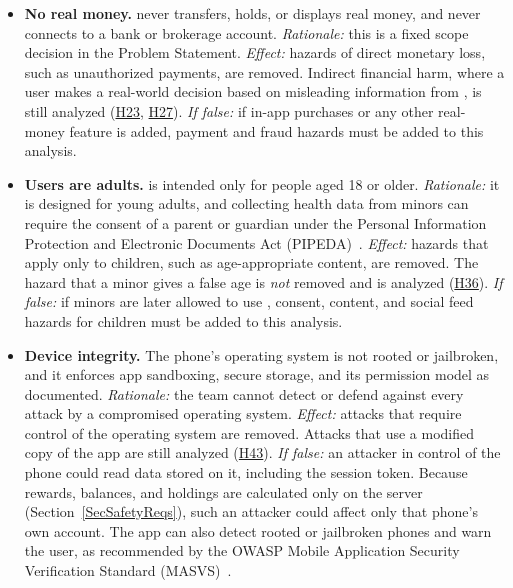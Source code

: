 \documentclass{article}
\begin{document}
\begin{itemize}
  \item[CA1:] \textbf{No real money.} \progname{} never transfers, holds, or
        displays real money, and never connects to a bank or brokerage account.
        \emph{Rationale:} this is a fixed scope decision in the Problem Statement.
        \emph{Effect:} hazards of direct monetary loss, such as unauthorized payments,
        are removed. Indirect financial harm, where a user makes a real-world decision
        based on misleading information from \progname{}, is still analyzed (\hyperref[H23]{H23}, \hyperref[H27]{H27}). \emph{If false:} if in-app purchases or any other
        real-money feature is added, payment and fraud hazards must be added to this
        analysis.
  \item[CA2:] \textbf{Users are adults.} \progname{} is intended only for
        people aged 18 or older. \emph{Rationale:} it is designed for young adults,
        and collecting health data from minors can require the consent of a parent or
        guardian under the Personal Information Protection and Electronic Documents
        Act (PIPEDA)~\cite{PIPEDA}. \emph{Effect:} hazards that apply only to
        children, such as age-appropriate content, are removed. The hazard that a
        minor gives a false age is \emph{not} removed and is analyzed (\hyperref[H36]{H36}). \emph{If false:} if minors are later allowed to use
        \progname{}, consent, content, and social feed hazards for children must be
        added to this analysis.
  \item[CA3:] \textbf{Device integrity.} The phone's operating system is not
        rooted or jailbroken, and it enforces app sandboxing, secure storage, and its
        permission model as documented. \emph{Rationale:} the team cannot detect or
        defend against every attack by a compromised operating system.
        \emph{Effect:} attacks that require control of the operating system are
        removed. Attacks that use a modified copy of the \progname{} app are still
        analyzed (\hyperref[H43]{H43}). \emph{If false:} an attacker in control
        of the phone could read data stored on it, including the session token.
        Because rewards, balances, and holdings are calculated only on the server
        (Section~\ref{SecSafetyReqs}), such an attacker could affect only that
        phone's own account. The app can also detect rooted or jailbroken phones and
        warn the user, as recommended by the OWASP Mobile Application Security
        Verification Standard (MASVS)~\cite{OWASPMASVS}.

\end{itemize}
\end{document}
